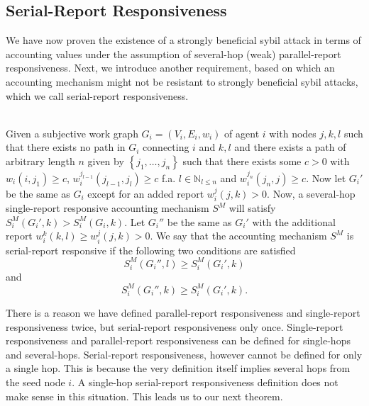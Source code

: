 \subsection{Serial-Report Responsiveness}
\label{subsec:Serial-Report Responsiveness}
\noindent{}We have now proven the existence of a strongly beneficial sybil attack in terms of accounting values under the assumption of several-hop (weak) parallel-report responsiveness. Next, we introduce another requirement, based on which an accounting mechanism might not be resistant to strongly beneficial sybil attacks, which we call serial-report responsiveness.

\begin{definition}\ \\
\label{def:Serial-report Responsiveness}
Given a subjective work graph $G_i=(V_i,E_i,w_i)$ of agent $i$ with nodes $j,k,l$ such that there exists no path in $G_i$ connecting $i$ and $k,l$ and there exists a path of arbitrary length $n$ given by $\left\lbrace{}j_1,\ldots,j_n\right\rbrace$ such that there exists some $c>0$ with $w_i(i,j_1)\geq{}c$, $w_i^{j_{l-1}}(j_{l-1},j_l)\geq{}c$ f.a. $l\in\mathbb{N}_{l\leq{}n}$ and $w_i^{j_n}(j_n,j)\geq{}c$. Now let $G_i'$ be the same as $G_i$ except for an added report $w_i^j(j,k)>0$. Now, a several-hop single-report responsive accounting mechanism $S^M$ will satisfy $S^M_i(G_i',k)>S^M_i(G_i,k)$. Let $G_i''$ be the same as $G_i'$ with the additional report $w_i^k(k,l)\geq{}w_i^j(j,k)>0$. We say that the accounting mechanism $S^M$ is serial-report responsive if the following two conditions are satisfied
\[ 
S^M_i(G_i'',l)\geq{}S^M_i(G_i',k)
\]
\noindent{}and 
\[
S^M_i(G_i'',k)\geq{}S^M_i(G_i',k).
\]
\end{definition}

\noindent{}There is a reason we have defined parallel-report responsiveness and single-report responsiveness twice, but serial-report responsiveness only once. Single-report responsiveness and parallel-report responsiveness can be defined for single-hops and several-hops. Serial-report responsiveness, however cannot be defined for only a single hop. This is because the very definition itself implies several hops from the seed node $i$. A single-hop serial-report responsiveness definition does not make sense in this situation. This leads us to our next theorem.\vspace{1em}\\

